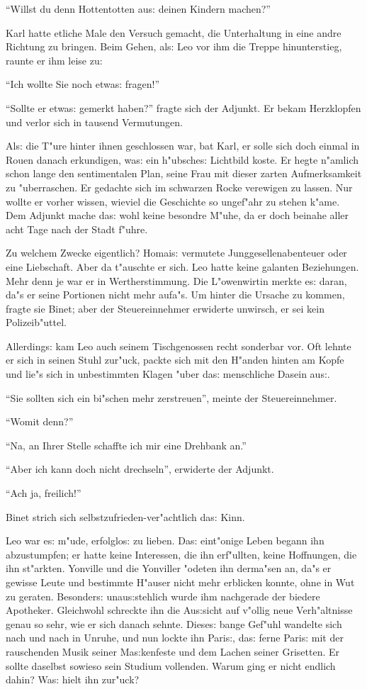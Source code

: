 \documentclass[oneside,12pt]{book}
\newcommand{\s}{s:}%
\begin{document}
"`Willst du denn Hottentotten au{\s} deinen Kindern machen?"'

Karl hatte etliche Male den Versuch gemacht, die Unterhaltung in
eine andre Richtung zu bringen. Beim Gehen, al{\s} Leo vor ihm die
Treppe hinunterstieg, raunte er ihm leise zu:

"`Ich wollte Sie noch etwa{\s} fragen!"'

"`Sollte er etwa{\s} gemerkt haben?"' fragte sich der Adjunkt. Er
bekam Herzklopfen und verlor sich in tausend Vermutungen.

Al{\s} die T"ure hinter ihnen geschlossen war, bat Karl, er solle
sich doch einmal in Rouen danach erkundigen, wa{\s} ein
h"ubsche{\s} Lichtbild koste. Er hegte n"amlich schon lange den
sentimentalen Plan, seine Frau mit dieser zarten Aufmerksamkeit zu
"uberraschen. Er gedachte sich im schwarzen Rocke verewigen zu
lassen. Nur wollte er vorher wissen, wieviel die Geschichte so
ungef"ahr zu stehen k"ame. Dem Adjunkt mache da{\s} wohl keine
besondre M"uhe, da er doch beinahe aller acht Tage nach der Stadt
f"uhre.

Zu welchem Zwecke eigentlich? Homai{\s} vermutete
Junggesellenabenteuer oder eine Liebschaft. Aber da t"auschte er
sich. Leo hatte keine galanten Beziehungen. Mehr denn je war er in
Wertherstimmung. Die L"owenwirtin merkte e{\s} daran, da"s er
seine Portionen nicht mehr aufa"s. Um hinter die Ursache zu
kommen, fragte sie Binet; aber der Steuereinnehmer erwiderte
unwirsch, er sei kein Polizeib"uttel.

Allerding{\s} kam Leo auch seinem Tischgenossen recht sonderbar
vor. Oft lehnte er sich in seinen Stuhl zur"uck, packte sich mit
den H"anden hinten am Kopfe und lie"s sich in unbestimmten Klagen
"uber da{\s} menschliche Dasein au{\s}.

"`Sie sollten sich ein bi"schen mehr zerstreuen"', meinte der
Steuereinnehmer.

"`Womit denn?"'

"`Na, an Ihrer Stelle schaffte ich mir eine Drehbank an."'

"`Aber ich kann doch nicht drechseln"', erwiderte der Adjunkt.

"`Ach ja, freilich!"'

Binet strich sich selbst\/zufrieden-ver"achtlich da{\s} Kinn.

Leo war e{\s} m"ude, erfolglo{\s} zu lieben. Da{\s} eint"onige
Leben begann ihn abzustumpfen; er hatte keine Interessen, die ihn
erf"ullten, keine Hoffnungen, die ihn st"arkten. Yonville und die
Yonviller "odeten ihn derma"sen an, da"s er gewisse Leute und
bestimmte H"auser nicht mehr erblicken konnte, ohne in Wut zu
geraten. Besonder{\s} unau{\s}stehlich wurde ihm nachgerade der
biedere Apotheker. Gleichwohl schreckte ihn die Au{\s}sicht auf
v"ollig neue Verh"altnisse genau so sehr, wie er sich danach
sehnte. Diese{\s} bange Gef"uhl wandelte sich nach und nach in
Unruhe, und nun lockte ihn Pari{\s}, da{\s} ferne Pari{\s} mit der
rauschenden Musik seiner Ma{\s}kenfeste und dem Lachen seiner
Grisetten. Er sollte daselbst sowieso sein Studium vollenden.
Warum ging er nicht endlich dahin? Wa{\s} hielt ihn zur"uck?
\end{document}
